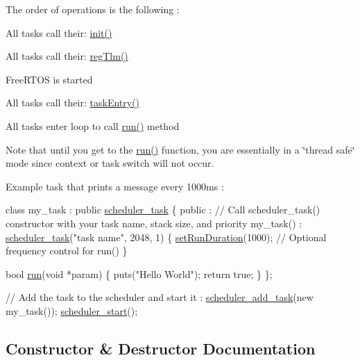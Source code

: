 The order of operations is the following \+:
\begin{DoxyItemize}
\item All tasks call their\+: \hyperlink{classscheduler__task_ab72fdc17bcb76996bfd41387d604f982}{init()}
\item All tasks call their\+: \hyperlink{classscheduler__task_a45281a4c3bf7abdebcf379f4076573e5}{reg\+Tlm()}
\item Free\+R\+T\+OS is started
\item All tasks call their\+: \hyperlink{classscheduler__task_a2a0499b206a36efd9542b00eac8f2a14}{task\+Entry()}
\item All tasks enter loop to call \hyperlink{classscheduler__task_a17e9027d2a79dded027a8d0737ab0e77}{run()} method
\end{DoxyItemize}

Note that until you get to the \hyperlink{classscheduler__task_a17e9027d2a79dded027a8d0737ab0e77}{run()} function, you are essentially in a \char`\"{}thread safe\char`\"{} mode since context or task switch will not occur.

Example task that prints a message every 1000ms \+: 
\begin{DoxyCode}
\textcolor{keyword}{class }my\_task : \textcolor{keyword}{public} \hyperlink{classscheduler__task}{scheduler\_task}
\{
    \textcolor{keyword}{public} :
    \textcolor{comment}{// Call scheduler\_task() constructor with your task name, stack size, and priority}
    my\_task() : \hyperlink{classscheduler__task}{scheduler\_task}(\textcolor{stringliteral}{"task name"}, 2048, 1)
    \{
        \hyperlink{classscheduler__task_aefca576927c9b6abc35d023b74d05b4c}{setRunDuration}(1000); \textcolor{comment}{// Optional frequency control for run()}
    \}

    \textcolor{keywordtype}{bool} \hyperlink{classscheduler__task_a17e9027d2a79dded027a8d0737ab0e77}{run}(\textcolor{keywordtype}{void} *param)
    \{
        puts(\textcolor{stringliteral}{"Hello World"});
        \textcolor{keywordflow}{return} \textcolor{keyword}{true};
    \}
\};

\textcolor{comment}{// Add the task to the scheduler and start it :}
\hyperlink{scheduler__task_8hpp_a7d6498410972beff36402038b4dffb8d}{scheduler\_add\_task}(\textcolor{keyword}{new} my\_task());
\hyperlink{scheduler__task_8hpp_a2a08a0d6b64f9b6d73393c59e20a6efb}{scheduler\_start}();
\end{DoxyCode}
 

\subsection{Constructor \& Destructor Documentation}
